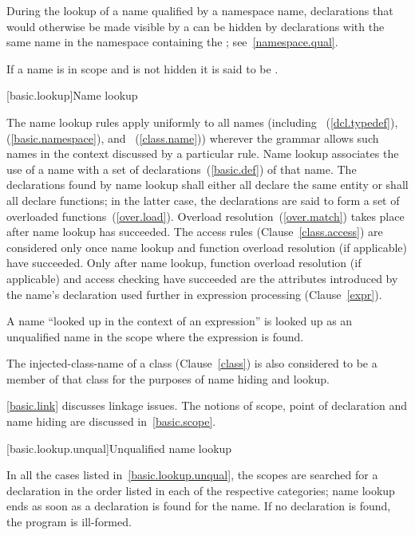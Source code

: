 \pnum
During the lookup of a name qualified by a namespace name, declarations
that would otherwise be made visible by a  can
be hidden by declarations with the same name in the namespace containing
the ; see~\ref{namespace.qual}.

\pnum
{}%
If a name is in scope and is not hidden it is said to be .%

[basic.lookup]{Name lookup}%
%
%

\pnum
The name lookup rules apply uniformly to all names (including
~(\ref{dcl.typedef}),
 (\ref{basic.namespace}), and
~(\ref{class.name})) wherever the grammar allows
such names in the context discussed by a particular rule. Name lookup
associates the use of a name with a set of declarations~(\ref{basic.def}) of
that name.
The declarations found by name lookup shall either all declare the same entity or
shall all declare functions;
in the latter case,
the declarations are said to form a set of overloaded
functions~(\ref{over.load}). Overload resolution~(\ref{over.match})
takes place after name lookup has succeeded. The access rules
(Clause~\ref{class.access}) are considered only once name lookup and
function overload resolution (if applicable) have succeeded. Only after
name lookup, function overload resolution (if applicable) and access
checking have succeeded are the attributes introduced by the name's
declaration used further in expression processing (Clause~\ref{expr}).

\pnum
A name ``looked up in the context of an expression'' is looked up as an
unqualified name in the scope where the expression is found.

\pnum
The injected-class-name of a class (Clause~\ref{class}) is also
considered to be a member of that class for the purposes of name hiding
and lookup.

\pnum
\begin{note} \ref{basic.link} discusses linkage issues. The notions of
scope, point of declaration and name hiding are discussed
in~\ref{basic.scope}. \end{note}

[basic.lookup.unqual]{Unqualified name lookup}

\pnum
{}%
%
In all the cases listed in~\ref{basic.lookup.unqual}, the scopes are
searched for a declaration in the order listed in each of the respective
categories; name lookup ends as soon as a declaration is found for the
name. If no declaration is found, the program is ill-formed.

